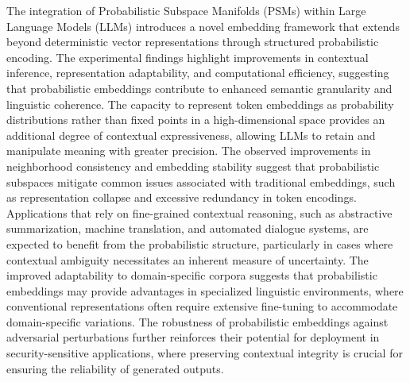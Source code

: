 \documentclass{article}
\begin{document}
The integration of Probabilistic Subspace Manifolds (PSMs) within Large Language Models (LLMs) introduces a novel embedding framework that extends beyond deterministic vector representations through structured probabilistic encoding. The experimental findings highlight improvements in contextual inference, representation adaptability, and computational efficiency, suggesting that probabilistic embeddings contribute to enhanced semantic granularity and linguistic coherence. The capacity to represent token embeddings as probability distributions rather than fixed points in a high-dimensional space provides an additional degree of contextual expressiveness, allowing LLMs to retain and manipulate meaning with greater precision. The observed improvements in neighborhood consistency and embedding stability suggest that probabilistic subspaces mitigate common issues associated with traditional embeddings, such as representation collapse and excessive redundancy in token encodings. Applications that rely on fine-grained contextual reasoning, such as abstractive summarization, machine translation, and automated dialogue systems, are expected to benefit from the probabilistic structure, particularly in cases where contextual ambiguity necessitates an inherent measure of uncertainty. The improved adaptability to domain-specific corpora suggests that probabilistic embeddings may provide advantages in specialized linguistic environments, where conventional representations often require extensive fine-tuning to accommodate domain-specific variations. The robustness of probabilistic embeddings against adversarial perturbations further reinforces their potential for deployment in security-sensitive applications, where preserving contextual integrity is crucial for ensuring the reliability of generated outputs.
\end{document}
